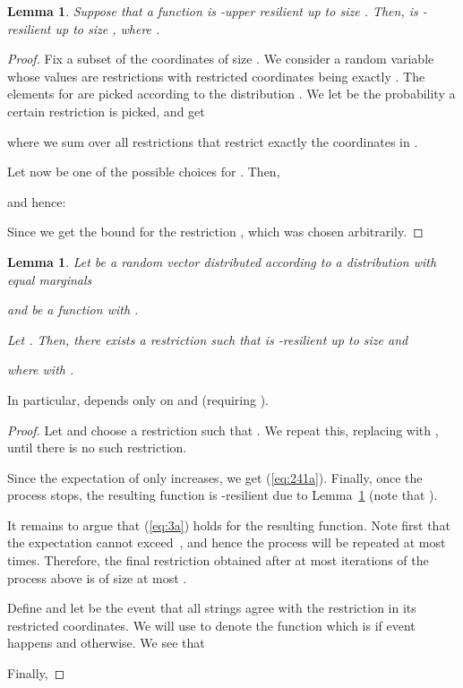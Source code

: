 \documentclass{daj}
\newcommand{\1}{\mathbbm{1}}
\theoremstyle{plain}
\newtheorem{lemma}[theorem]{Lemma}
\theoremstyle{definition}
\begin{document}
\begin{lemma}
\label{lem:stability-equivalence}
Suppose that a function  is -upper resilient up to size .
Then,  is -resilient up to size , where 
.
\end{lemma} 
\begin{proof}
Fix a subset  of the coordinates of size .
We consider a random variable  whose values are
restrictions with restricted coordinates being exactly .
The elements  for  are picked according to the 
distribution .
We let  be the probability a certain restriction  is picked, and
get

where we sum over all restrictions  that restrict exactly the coordinates
in .

Let now  be one of the possible choices for .
Then,

and hence:

Since  we get the bound
for the restriction , which was chosen arbitrarily.
\end{proof}

\begin{lemma}\label{lem:restrictToMakeStable}
Let  be a random vector distributed according to
a distribution with equal marginals 

and  be a function
with .

Let . Then, there exists
a restriction  such that  is -resilient
up to size  and

where  
with .
\end{lemma}

In particular,  depends only on  and 
(requiring ).

\begin{proof}
Let  and
choose a restriction  such that 
.
We repeat this, replacing  with , until there is no such 
restriction.

Since the expectation of  only increases, we get (\ref{eq:241a}).
Finally, once the process stops, the resulting function is -resilient
due to Lemma~\ref{lem:stability-equivalence} 
(note that ).

It remains to argue that (\ref{eq:3a}) holds for the resulting function.
Note first that the expectation cannot exceed~, and
hence the process will be repeated at 
most  times.
Therefore, the final restriction  obtained after at most  iterations
of the process above is of size at most .

Define  and
let  be the event that all 
strings 
agree with the restriction  in its restricted coordinates.
We will use  to denote the function which is 
 if event  happens and  otherwise.
We see that

Finally,

\end{proof}
\end{document}
